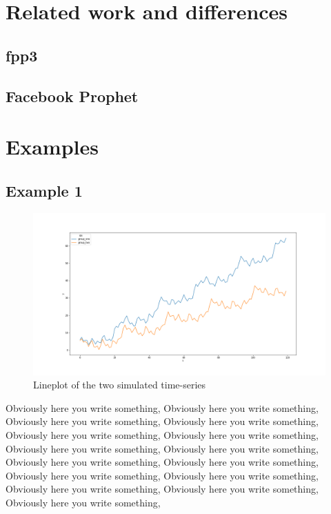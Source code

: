 \documentclass{article}
\begin{document}
\section{Related work and differences}

\subsection{fpp3}

\subsection{Facebook Prophet}

\section{Examples}

\subsection{Example 1}

\begin{figure}[H]
    \centerline{\includegraphics[scale = 0.45]{../plots/ex1_plot_data.png}}
    \caption{Lineplot of the two simulated time-series}
\end{figure}


Obviously here you write something, Obviously here you write something, Obviously here you write something, Obviously here you write something, Obviously here you write something, Obviously here you write something, Obviously here you write something, Obviously here you write something, Obviously here you write something, Obviously here you write something, Obviously here you write something, Obviously here you write something, Obviously here you write something, Obviously here you write something, Obviously here you write something, 
\end{document}
